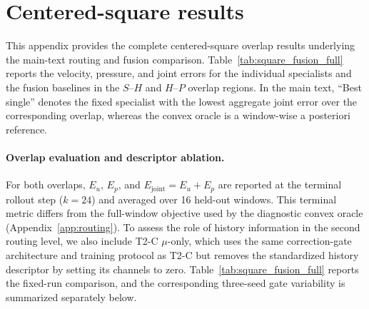 \section{Centered-square results}
\label{app:square}


This appendix provides the complete centered-square overlap results
underlying the main-text routing and fusion comparison. Table~\ref{tab:square_fusion_full} reports the velocity, pressure,
and joint errors for the individual specialists and the fusion baselines in the $S$--$H$ and $H$--$P$ overlap regions. In the main text, ``Best single'' denotes the fixed specialist with the
lowest aggregate joint error over the corresponding overlap, whereas the convex oracle is a window-wise a posteriori reference.



\paragraph{Overlap evaluation and descriptor ablation.}
For both overlaps, $E_u$, $E_p$, and $E_{\mathrm{joint}}=E_u+E_p$ are reported at the terminal rollout step ($k=24$) and averaged over 16 held-out windows.  This terminal metric differs from the full-window objective used by the diagnostic convex oracle (Appendix~\ref{app:routing}). To assess the role of history information in the second routing level, we also include T2-C $\mu$-only, which uses the same correction-gate architecture and training protocol as T2-C but removes the standardized history descriptor by setting its channels to zero. Table~\ref{tab:square_fusion_full} reports the fixed-run comparison, and the corresponding three-seed gate variability is summarized separately below.

